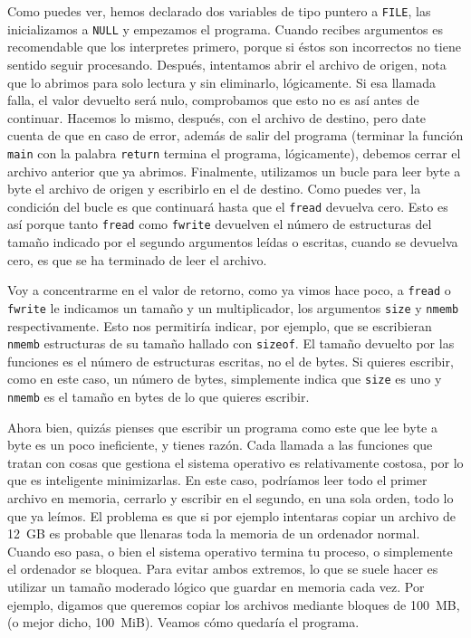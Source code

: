 \documentclass[a4paper]{article}
\begin{document}
Como puedes ver, hemos declarado dos variables de tipo puntero a \verb!FILE!,
las inicializamos a \verb!NULL! y empezamos el programa. Cuando recibes
argumentos es recomendable que los interpretes primero, porque si éstos son
incorrectos no tiene sentido seguir procesando. Después, intentamos abrir el
archivo de origen, nota que lo abrimos para solo lectura y sin eliminarlo,
lógicamente. Si esa llamada falla, el valor devuelto será nulo, comprobamos
que esto no es así antes de continuar. Hacemos lo mismo, después, con el
archivo de destino, pero date cuenta de que en caso de error, además
de salir del programa (terminar la función \verb!main! con la palabra
\verb!return! termina el programa, lógicamente), debemos cerrar el archivo
anterior que ya abrimos. Finalmente, utilizamos un bucle para leer byte a byte
el archivo de origen y escribirlo en el de destino. Como puedes ver,
la condición del bucle es que continuará hasta que el \verb!fread! devuelva
cero. Esto es así porque tanto \verb!fread! como \verb!fwrite! devuelven
el número de estructuras del tamaño indicado por el segundo argumentos leídas o
escritas, cuando se devuelva cero, es que se ha terminado de leer el archivo.

Voy a concentrarme en el valor de retorno, como ya vimos hace poco, a
\verb!fread! o \verb!fwrite! le indicamos un tamaño y un multiplicador, los
argumentos \verb!size! y \verb!nmemb! respectivamente. Esto nos permitiría
indicar, por ejemplo, que se escribieran \verb!nmemb! estructuras de su tamaño
hallado con \verb!sizeof!. El tamaño devuelto por las funciones es el número
de estructuras escritas, no el de bytes. Si quieres escribir, como en este
caso, un número de bytes, simplemente indica que \verb!size! es uno y
\verb!nmemb! es el tamaño en bytes de lo que quieres escribir.

Ahora bien, quizás pienses que escribir un programa como este que lee byte a
byte es un poco ineficiente, y tienes razón. Cada llamada a las funciones
que tratan con cosas que gestiona el sistema operativo es relativamente
costosa, por lo que es inteligente minimizarlas. En este caso, podríamos leer
todo el primer archivo en memoria, cerrarlo y escribir en el segundo, en una
sola orden, todo lo que ya leímos. El problema es que si por ejemplo intentaras
copiar un archivo de 12~GB es probable que llenaras toda la memoria
de un ordenador normal. Cuando eso pasa, o bien el sistema operativo termina tu
proceso, o simplemente el ordenador se bloquea. Para evitar ambos extremos, lo
que se suele hacer es utilizar un tamaño moderado lógico que guardar en memoria
cada vez. Por ejemplo, digamos que queremos copiar los archivos mediante bloques
de 100~MB, (o mejor dicho, 100~MiB). Veamos cómo
quedaría el programa.
\end{document}
